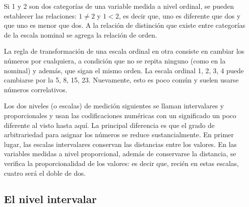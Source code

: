 \documentclass[]{book}
\begin{document}
Si 1 y 2 son dos categorías de una variable medida a nivel ordinal, se pueden establecer las relaciones: \(1 \neq 2\) y \(1<2\), es decir que, uno es diferente que dos y que uno es menor que dos. A la relación de distinción que existe entre categorías de la escala nominal se agrega la relación de orden.

La regla de transformación de una escala ordinal en otra consiste en cambiar los números por cualquiera, a condición que no se repita ninguno (como en la nominal) y además, que sigan el mismo orden. La escala ordinal 1, 2, 3, 4 puede cambiarse por la 5, 8, 15, 23. Nuevamente, esto es poco común y suelen usarse números correlativos.

Los dos niveles (o escalas) de medición siguientes se llaman intervalares y proporcionales y usan las codificaciones numéricas con un significado un poco diferente al visto hasta aquí. La principal diferencia es que el grado de arbitrariedad para asignar los números se reduce sustancialmente. En primer lugar, las escalas intervalares conservan las distancias entre los valores. En las variables medidas a nivel proporcional, además de conservarse la distancia, se verifica la proporcionalidad de los valores: es decir que, recién en estas escalas, cuatro será el doble de dos.

\hypertarget{el-nivel-intervalar}{%
\subsection{El nivel intervalar}\label{el-nivel-intervalar}}
\end{document}
